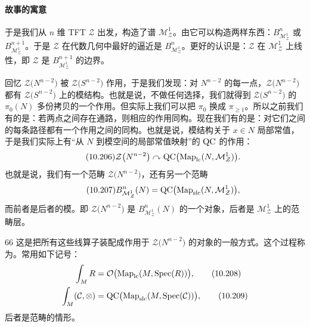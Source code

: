 \paragraph{故事的寓意}

于是我们从 $n$ 维 TFT $\mathcal{Z}$ 出发，构造了谱 $\mathcal{M}_{\mathcal{Z}}^{1}$。由它可以构造两样东西：$B_{\mathcal{M}_{\mathcal{Z}}^{1}}^{n}$ 或 $B_{\mathcal{M}_{\mathcal{Z}}^{1}}^{n+1}$。于是 $\mathcal{Z}$ 在代数几何中最好的逼近是 $B_{\mathcal{M}_{\mathcal{Z}}^{1}}^{n}$。更好的认识是：$\mathcal{Z}$ 在 $\mathcal{M}_{\mathcal{Z}}^{1}$ 上线性，即 $\mathcal{Z}$ 是 $B_{\mathcal{M}_{\mathcal{Z}}^{1}}^{n+1}$ 的边界。

回忆 $\mathcal{Z}\big(N^{n-2}\big)$ 被 $\mathcal{Z}\big(S^{n-2}\big)$ 作用，于是我们发现：对 $N^{n-2}$ 的每一点，$\mathcal{Z}\big(N^{n-2}\big)$ 都有 $\mathcal{Z}\big(S^{n-2}\big)$ 上的模结构。也就是说，不做任何选择，我们就得到 $\mathcal{Z}\big(S^{n-2}\big)$ 的 $\pi_0(N)$ 多份拷贝的一个作用。但实际上我们可以把 $\pi_0$ 换成 $\pi_{\ge1}$。所以之前我们有的是：若两点之间存在通路，则相应的作用同构。现在我们有的是：对它们之间的每条路径都有一个作用之间的同构。也就是说，模结构关于 $x\in N$ 局部常值，于是我们实际上有“从 $N$ 到模空间的局部常值映射”的 $\mathrm{QC}$ 的作用：
\begin{equation}\tag{10.206}
\mathcal{Z}\big(N^{n-2}\big)\curvearrowright\mathrm{QC}\big(\mathrm{Map}_{\mathrm{lc}}(N,\mathcal{M}_{\mathcal{Z}}^{1})\big).
\end{equation}
也就是说，我们有一个范畴 $\mathcal{Z}\big(N^{n-2}\big)$，还有另一个范畴
\begin{equation}\tag{10.207}
B_{\mathcal{M}_{\mathcal{Z}}^{1}}^{n}(N)=\mathrm{QC}\big(\mathrm{Map}_{\mathrm{slc}}(N,\mathcal{M}_{\mathcal{Z}}^{1})\big),
\end{equation}
而前者是后者的模。即 $\mathcal{Z}\big(N^{n-2}\big)$ 是 $B_{\mathcal{M}_{\mathcal{Z}}^{1}}^{n}(N)$ 的一个对象，后者是 $\mathcal{M}_{\mathcal{Z}}^{1}$ 上的范畴层。

\begin{srcrem}{66}
这是把所有这些线算子装配成作用于 $\mathcal{Z}\big(N^{n-2}\big)$ 的对象的一般方式。这个过程称为。常用如下记号：
\begin{align}
\int_M R&=\mathcal{O}\big(\mathrm{Map}_{\mathrm{lc}}(M,\mathrm{Spec}(R))\big),\tag{10.208}\\
\int_M (\mathcal{C},\otimes)&=\mathrm{QC}\big(\mathrm{Map}_{\mathrm{slc}}(M,\mathrm{Spec}(\mathcal{C}))\big),\tag{10.209}
\end{align}
后者是范畴的情形。
\end{srcrem}

